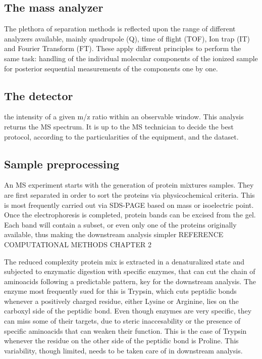 \documentclass[11pt, a4paper]{report}
\begin{document}
\subsection{The mass analyzer}

The plethora of separation methods is reflected upon the range of different analyzers available, mainly quadrupole (Q), time of flight (TOF), Ion trap (IT) and Fourier Transform (FT). These apply different principles to perform the same task: handling of the individual molecular components of the ionized sample for posterior sequential measurements of the components one by one.

\subsection{The detector}

the intensity of a given m/z ratio within an observable window. This analysis returns the MS spectrum. It is up to the MS technician to decide the best protocol, according to the particularities of the equipment, and the dataset.




\subsection{Sample preprocessing}

An MS experiment starts with the generation of protein mixtures samples. They are first separated in order to sort the proteins via physicochemical criteria. This is most frequently carried out via SDS-PAGE based on mass or isoelectric point.  Once the electrophoresis is completed, protein bands can be excised from the gel. Each band will contain a subset, or even only one of the proteins originally available, thus making the downstream analysis simpler REFERENCE COMPUTATIONAL METHODS CHAPTER 2

The reduced complexity protein mix is extracted in a denaturalized state and subjected to enzymatic digestion with specific enzymes, that can cut the chain of aminoacids following a predictable pattern, key for the downstream analysis. The enzyme most frequently sued for this is Trypsin, which cuts peptidic bonds whenever a positively charged residue, either Lysine or Arginine, lies on the carboxyl side of the peptidic bond. Even though enzymes are very specific, they can miss some of their targets, due to steric inaccesability or the presence of specific aminoacids that can weaken their function. This is the case of Trypsin whenever the residue on the other side of the peptidic bond is Proline. This variability, though limited, needs to be taken care of in downstream analysis.
\end{document}

